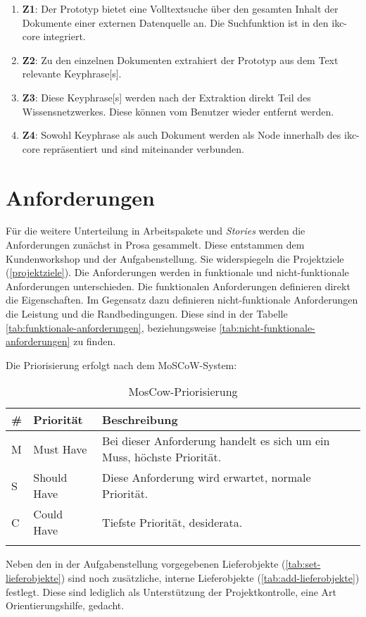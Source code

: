 \begin{enumerate}
    \item \textbf{Z1}: Der Prototyp bietet eine Volltextsuche über den gesamten Inhalt der Dokumente einer externen Datenquelle an. Die Suchfunktion ist in den \gls{ikc-core} integriert.
    \item \textbf{Z2}: Zu den einzelnen Dokumenten extrahiert der Prototyp aus dem Text relevante \gls{Keyphrase}[s].
    \item \textbf{Z3}: Diese \gls{Keyphrase}[s] werden nach der Extraktion direkt Teil des Wissensnetzwerkes. Diese können vom Benutzer wieder entfernt werden.
    \item \textbf{Z4}: Sowohl \gls{Keyphrase} als auch Dokument werden als Node innerhalb des \gls{ikc-core} repräsentiert und sind miteinander verbunden. 
\end{enumerate}

\section{Anforderungen} \label{sec:anforderungen}

Für die weitere Unterteilung in Arbeitspakete und \textit{Stories} werden die Anforderungen zunächst in Prosa gesammelt. Diese entstammen dem Kundenworkshop und der Aufgabenstellung. Sie widerspiegeln die Projektziele (\autoref{projektziele}). Die Anforderungen werden in funktionale und nicht-funktionale Anforderungen unterschieden. Die funktionalen Anforderungen definieren direkt die Eigenschaften. Im Gegensatz dazu definieren nicht-funktionale Anforderungen die Leistung und die Randbedingungen. Diese sind in der Tabelle \autoref{tab:funktionale-anforderungen}, beziehungsweise \autoref{tab:nicht-funktionale-anforderungen} zu finden.

Die Priorisierung erfolgt nach dem \gls{MoSCoW-System}:

\begin{longtable}{|p{1.5cm} | p{2.5cm} | p{7.2cm}|}
  \hline
    \# & Priorität & Beschreibung \\\hline
    M & Must Have & Bei dieser Anforderung handelt es sich um ein Muss, höchste Priorität.\\\hline
    S & Should Have & Diese Anforderung wird erwartet, normale Priorität.\\\hline
    C & Could Have & Tiefste Priorität, desiderata.\\\hline
    \caption{MosCow-Priorisierung}
  \label{tab:moscow}
\end{longtable}


Neben den in der Aufgabenstellung vorgegebenen Lieferobjekte (\autoref{tab:set-lieferobjekte}) sind noch zusätzliche, interne Lieferobjekte (\autoref{tab:add-lieferobjekte}) festlegt. Diese sind lediglich als Unterstützung der Projektkontrolle, eine Art Orientierungshilfe, gedacht.
